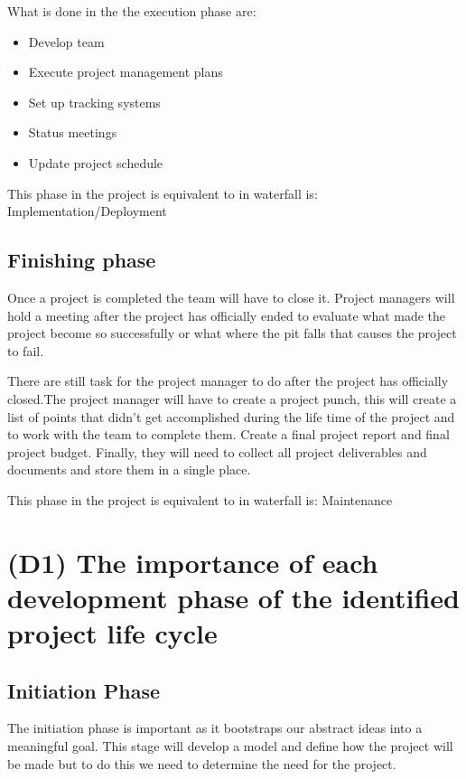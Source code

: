 \documentclass{article}
\begin{document}
What is done in the the execution phase are:
\begin{itemize}
    \item Develop team
    \item Execute project management plans
    \item Set up tracking systems
    \item Status meetings
    \item Update project schedule
\end{itemize}

This phase in the project is equivalent to in waterfall is: Implementation/Deployment

\subsection{Finishing phase}

Once a project is completed the team will have to close it. Project managers will hold a meeting after the project has officially ended to evaluate what made the project become so successfully or what where the pit falls that causes the project to fail.

There are still task for the project manager to do after the project has officially closed.The project manager will have to create a project punch, this will create a list of points that didn't get accomplished during the life time of the project and to work with the team to complete them. Create a final project report and final project budget. Finally, they will need to collect all project deliverables and  documents and store them in a single place.

This phase in the project is equivalent to in waterfall is: Maintenance

\break
\section{(D1) The importance of each development phase of the identified project life cycle}

\subsection{Initiation Phase}
The initiation phase is important as it bootstraps our abstract ideas into a meaningful goal. This stage will develop a model and define how the project will be made but to do this we need to determine the need for the project.
\end{document}
